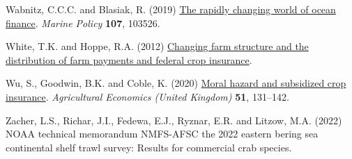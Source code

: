 \documentclass[
  letterpaper,
  DIV=11,
  numbers=noendperiod]{scrartcl}
\newlength{\cslhangindent}
\newlength{\cslentryspacingunit} %
\newenvironment{CSLReferences}[2] %
 {%
  \setlength{\parindent}{0pt}
  \ifodd #1
  \let\oldpar\par
  \def\par{\hangindent=\cslhangindent\oldpar}
  \fi
  \setlength{\parskip}{#2\cslentryspacingunit}
 }%
 {}
\theoremstyle{plain}
\theoremstyle{plain}
\theoremstyle{remark}
\begin{document}
\begin{CSLReferences}{1}{0}
\leavevmode{}%
Wabnitz, C.C.C. and Blasiak, R. (2019)
\href{https://doi.org/10.1016/j.marpol.2019.103526}{The rapidly changing
world of ocean finance}. \emph{Marine Policy} \textbf{107}, 103526.

\leavevmode{}%
White, T.K. and Hoppe, R.A. (2012)
\href{https://www.ers.usda.gov}{Changing farm structure and the
distribution of farm payments and federal crop insurance}.

\leavevmode{}%
Wu, S., Goodwin, B.K. and Coble, K. (2020)
\href{https://doi.org/10.1111/agec.12545}{Moral hazard and subsidized
crop insurance}. \emph{Agricultural Economics (United Kingdom)}
\textbf{51}, 131--142.

\leavevmode{}%
Zacher, L.S., Richar, J.I., Fedewa, E.J., Ryznar, E.R. and Litzow, M.A.
(2022) NOAA technical memorandum NMFS-AFSC the 2022 eastern bering sea
continental shelf trawl survey: Results for commercial crab species.

\end{CSLReferences}
\end{document}
